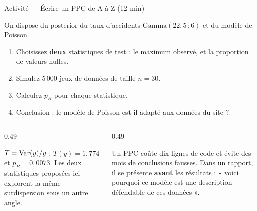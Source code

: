 \begin{frame}{Activité --- Écrire un PPC de A à Z (12 min)}
\begin{abox}[Consigne]
On dispose du posterior du taux d'accidents $\mathrm{Gamma}(22{,}5\,;6)$ et du
modèle de Poisson.
\begin{enumerate}
  \item Choisissez \textbf{deux} statistiques de test : le maximum observé, et la
        proportion de valeurs nulles.
  \item Simulez $5\,000$ jeux de données de taille $n = 30$.
  \item Calculez $p_B$ pour chaque statistique.
  \item Conclusion : le modèle de Poisson est-il adapté aux données du site ?
\end{enumerate}
\end{abox}
\vspace{1mm}
\begin{columns}[t]
\begin{column}{0.49\textwidth}
\begin{solbox}
$T = \mathrm{Var}(y)/\bar y$ : $T(y) = 1{,}774$ et $p_B = 0{,}0073$.
Les deux statistiques proposées ici explorent la même surdispersion sous un
autre angle.
\end{solbox}
\end{column}
\begin{column}{0.49\textwidth}
\begin{kbox}
Un PPC coûte dix lignes de code et évite des mois de conclusions fausses. Dans un
rapport, il se présente \textbf{avant} les résultats : « voici pourquoi ce modèle
est une description défendable de ces données ».
\end{kbox}
\end{column}
\end{columns}
\end{frame}

